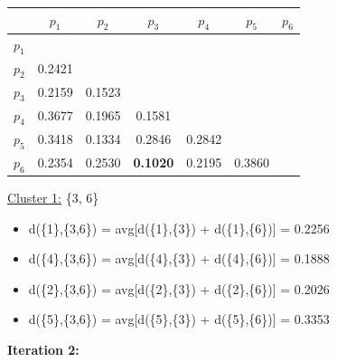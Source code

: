 \documentclass[11pt]{article}
\begin{document}
	\begin{center}
    	\begin{adjustbox}{max width=\textwidth}
		\begin{tabular}{ | c | c | c | c | c | c | c |}
	  	 	\hline

	  	 	& \textbf{$p_1$} & \textbf{$p_2$} & \textbf{$p_3$} & \textbf{$p_4$} & \textbf{$p_5$} & \textbf{$p_6$}\\
	  	 	\hline
	  	 	
	  	 	\textbf{$p_1$} &  &  &  &  &  &\\
	  	 	\hline
	  	 	
	  	 	\textbf{$p_2$} & 0.2421 &  &  &  &  &  \\
	  	 	\hline
	  	 	
	  	 	\textbf{$p_3$} & 0.2159 & 0.1523 &  &  &  & \\
	  	 	\hline
	  	 	
	  	 	\textbf{$p_4$} & 0.3677 & 0.1965 & 0.1581 &  &  & \\
	  	 	\hline
	  	 	
	  	 	\textbf{$p_5$} & 0.3418 & 0.1334 & 0.2846 & 0.2842 &  & \\
	  	 	\hline	
	  	 	
	  	 	\textbf{$p_6$} & 0.2354 & 0.2530 & \textbf{0.1020} & 0.2195 & 0.3860 & \\
	  	 	\hline			
    		\end{tabular}
    	\end{adjustbox}
	\end{center}
	
	\underline{Cluster 1:} \{3, 6\}
	
	\begin{itemize}
		\item d(\{1\},\{3,6\}) = avg[d(\{1\},\{3\}) + d(\{1\},\{6\})] = 0.2256
		\item d(\{4\},\{3,6\}) = avg[d(\{4\},\{3\}) + d(\{4\},\{6\})] = 0.1888
		\item d(\{2\},\{3,6\}) = avg[d(\{2\},\{3\}) + d(\{2\},\{6\})] = 0.2026
		\item d(\{5\},\{3,6\}) = avg[d(\{5\},\{3\}) + d(\{5\},\{6\})] = 0.3353
	\end{itemize}
	
	\vspace{5mm}
	
	\textbf{Iteration 2:}
	
\end{document}
